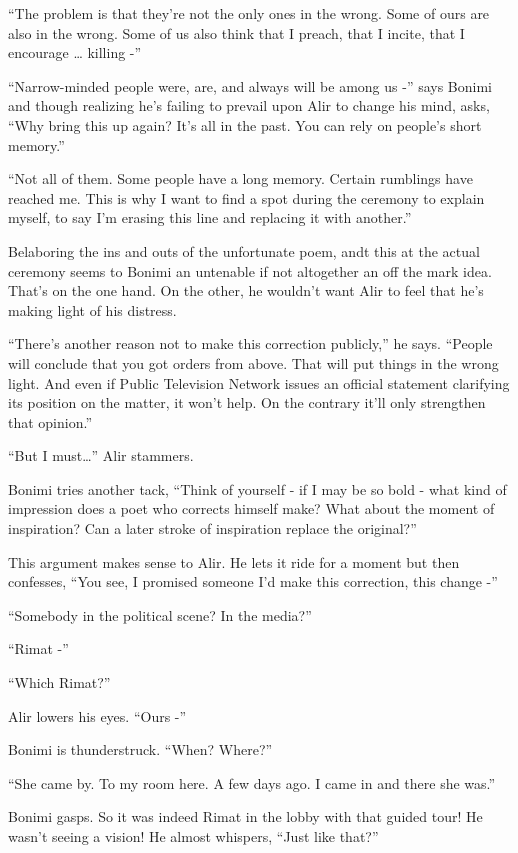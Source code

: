 \documentclass[twoside,11pt]{book}
\begin{document}
``The problem is that they're not the only ones in the wrong. Some of ours are also in the wrong. Some of
us also think that I preach, that I incite, that I encourage {\dots} killing -''

``Narrow-minded people were, are, and always will be among us -'' says Bonimi and though
realizing he's failing to prevail upon Alir to change his mind, asks, ``Why bring this up again? It's
all in the past. You can rely on people's short memory.''

``Not all of them. Some people have a long memory. Certain rumblings have reached me. This is why I want to
find a spot during the ceremony to explain myself, to say I'm erasing this line and replacing it with
another.''

Belaboring the ins and outs of the unfortunate poem, andt this at the actual ceremony seems to Bonimi an untenable if
not altogether an off the mark idea. That's on the one hand. On the other, he wouldn't want Alir to feel that he's
making light of his distress.

``There's another reason not to make this correction publicly,'' he says. ``People will conclude that you
got orders from above. That will put things in the wrong light. And even if Public Television Network issues an
official statement clarifying its position on the matter, it won't help. On the contrary it'll only strengthen that
opinion.''

``But I must{\dots}'' Alir stammers.

Bonimi tries another tack, ``Think of yourself - if I may be so bold - what kind of impression does a poet
who corrects himself make? What about the moment of inspiration? Can a later stroke of inspiration replace the
original?''

This argument makes sense to Alir. He lets it ride for a moment but then confesses, ``You see, I promised
someone I'd make this correction, this change -''

``Somebody in the political scene? In the media?''

``Rimat -''

``Which Rimat?''

Alir lowers his eyes. ``Ours -''

Bonimi is thunderstruck. ``When? Where?''

``She came by. To my room here. A few days ago.  I came in and there she was.''

Bonimi gasps. So it was indeed Rimat in the lobby with that guided tour! He wasn't seeing a vision! He almost whispers,
``Just like that?''
\end{document}
